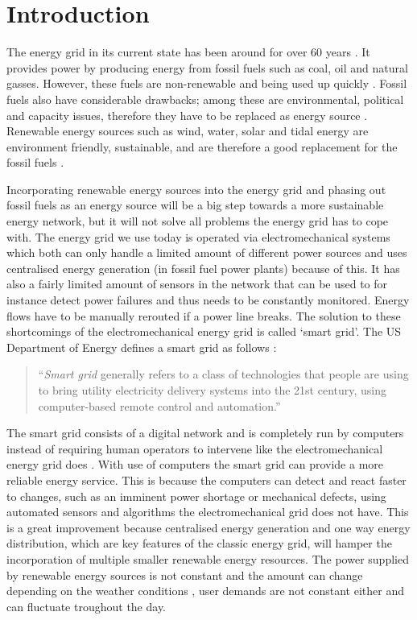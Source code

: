 \section{Introduction}\label{intro}
The energy grid in its current state has been around for over 60 years \cite{Wang2011}. It provides power by producing energy from fossil fuels such as coal, oil and natural gasses. However, these fuels are non-renewable and being used up quickly \cite{Wang2011}. Fossil fuels also have considerable drawbacks; among these are environmental, political and capacity issues, therefore they have to be replaced as energy source \cite{friedman2008hot}. Renewable energy sources such as wind, water, solar and tidal energy are environment friendly, sustainable, and are therefore a good replacement for the fossil fuels \cite{Tromly2001}.

Incorporating renewable energy sources into the energy grid and phasing out fossil fuels as an energy source will be a big step towards a more sustainable energy network, but it will not solve all problems the energy grid has to cope with. The energy grid we use today is operated via electromechanical systems which both can only handle a limited amount of different power sources and uses centralised energy generation (in fossil fuel power plants) because of this. It has also a fairly limited amount of sensors in the network that can be used to for instance detect power failures and thus needs to be constantly monitored. Energy flows have to be manually rerouted if a power line breaks. The solution to these shortcomings of the electromechanical energy grid is called `smart grid'. The US Department of Energy defines a smart grid as follows \cite{doe}: 
 
\begin{quote}
``\emph{Smart grid} generally refers to a class of technologies that people are using to bring utility electricity delivery systems into the 21st century, using computer-based remote control and automation.''
\end{quote}

The smart grid consists of a digital network and is completely run by computers instead of requiring human operators to intervene like the electromechanical energy grid does \cite{Moslehi2010}. With use of computers the smart grid can provide a more reliable energy service. This is because the computers can detect and react faster to changes, such as an imminent power shortage or mechanical defects, using automated sensors and algorithms the electromechanical grid does not have. This is a great improvement because centralised energy generation and one way energy distribution, which are key features of the classic energy grid, will hamper the incorporation of multiple smaller renewable energy resources. The power supplied by renewable energy sources is not constant and the amount can change depending on the weather conditions \cite{RamchurnVitelingumRogersJennings2014}, user demands are not constant either and can fluctuate troughout the day.

